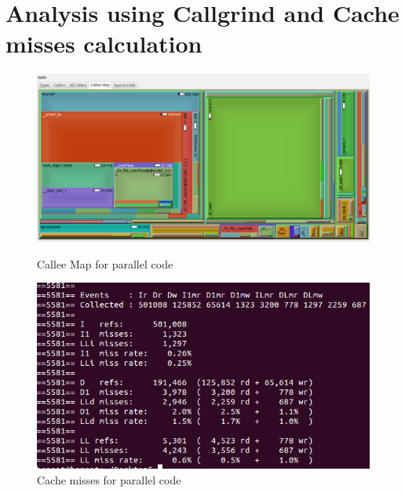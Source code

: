 \documentclass{sem5}
\begin{document}
\newpage
\section{Analysis using Callgrind and Cache misses calculation}
\begin{figure}[!htp]
\centering
\includegraphics[scale=.28]{call.png}
\caption{Callee Map for parallel code}
\includegraphics[scale=.3]{cache.png}
\caption{Cache misses for parallel code}
\end{figure}
\end{document}
